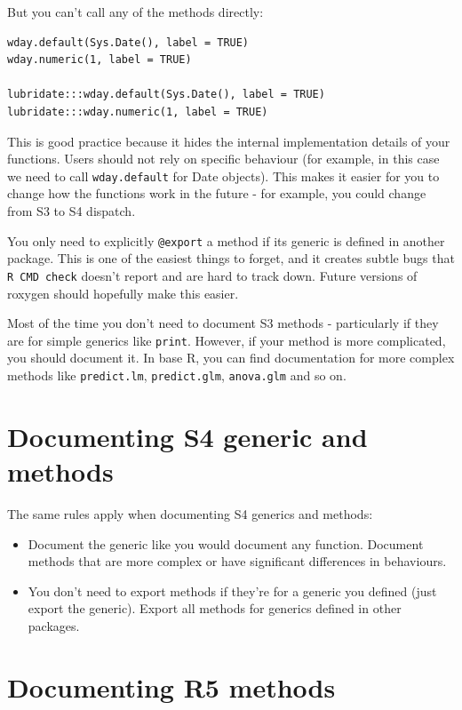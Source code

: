 But you can't call any of the methods directly:

\begin{verbatim}
wday.default(Sys.Date(), label = TRUE)
wday.numeric(1, label = TRUE)

lubridate:::wday.default(Sys.Date(), label = TRUE)
lubridate:::wday.numeric(1, label = TRUE)
\end{verbatim}

This is good practice because it hides the internal implementation
details of your functions. Users should not rely on specific behaviour
(for example, in this case we need to call \texttt{wday.default} for
Date objects). This makes it easier for you to change how the functions
work in the future - for example, you could change from S3 to S4
dispatch.

You only need to explicitly \texttt{@export} a method if its generic is
defined in another package. This is one of the easiest things to forget,
and it creates subtle bugs that \texttt{R CMD check} doesn't report and
are hard to track down. Future versions of roxygen should hopefully make
this easier.

Most of the time you don't need to document S3 methods - particularly if
they are for simple generics like \texttt{print}. However, if your
method is more complicated, you should document it. In base R, you can
find documentation for more complex methods like \texttt{predict.lm},
\texttt{predict.glm}, \texttt{anova.glm} and so on.

\section{Documenting S4 generic and methods}

The same rules apply when documenting S4 generics and methods:

\begin{itemize}
\item
  Document the generic like you would document any function. Document
  methods that are more complex or have significant differences in
  behaviours.
\item
  You don't need to export methods if they're for a generic you defined
  (just export the generic). Export all methods for generics defined in
  other packages.
\end{itemize}

\section{Documenting R5 methods}

